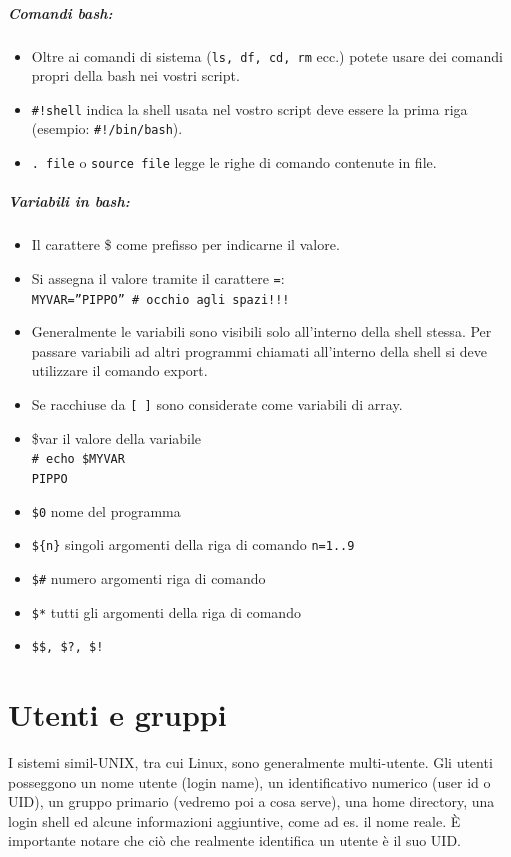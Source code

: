 \documentclass[a4paper]{report}
\newcommand\tab[1][1cm]{\hspace*{#1}}
\begin{document}
\paragraph{Comandi bash:}
\begin{itemize}
\item Oltre ai comandi di sistema (\texttt{ls, df, cd, rm}
ecc.) potete usare dei comandi propri della bash
nei vostri script.
\item \texttt{\#!shell} indica la shell usata nel vostro script
deve essere la prima riga (esempio: \texttt{\#!/bin/bash}).
\item \texttt{. file} o \texttt{source file} legge le righe di
comando contenute in file.
\end{itemize}
\paragraph{Variabili in bash:}
\begin{itemize}
\item Il carattere \$ come prefisso per indicarne il valore.
\item Si assegna il valore tramite il carattere \texttt{=}:\\
\tab\texttt{MYVAR=”PIPPO” \# occhio agli spazi!!!}
\item Generalmente le variabili sono visibili solo all'interno
della shell stessa. Per passare variabili ad altri
programmi chiamati all'interno della shell si deve
utilizzare il comando export.
\item Se racchiuse da \texttt{[ ]} sono considerate come variabili
di array.
\item \$var il valore della variabile
\\\tab\texttt{\# echo \$MYVAR}
\\\tab\texttt{PIPPO}
\item \texttt{\$0} nome del programma
\item \texttt{\$\{n\}} singoli argomenti della riga di comando \texttt{n=1..9}
\item \texttt{\$\#} numero argomenti riga di comando
\item \texttt{\$*} tutti gli argomenti della riga di comando
\item \texttt{\$\$, \$?, \$!}
\end{itemize}

\chapter{Utenti e gruppi}
I sistemi simil-UNIX, tra cui Linux, sono
generalmente multi-utente. Gli utenti
posseggono un nome utente (login name), un
identificativo numerico (user id o UID), un
gruppo primario (vedremo poi a cosa serve),
una home directory, una login shell ed
alcune informazioni aggiuntive, come ad es. il
nome reale. È importante notare che ciò che
realmente identifica un utente è il suo UID.\\
\end{document}
